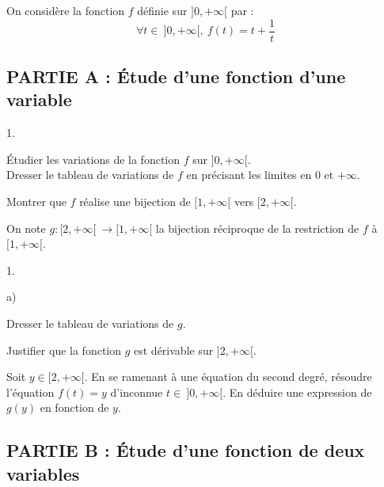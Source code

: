 \documentclass[11pt]{article}%
\begin{document}
\noindent %
On considère la fonction $f$ définie sur $]0,+\infty[$ par :
\[
  \forall t \in \ ]0,+\infty[, \ f(t) = t + \dfrac{1}{t}
\]

\subsection*{PARTIE A : \'Etude d'une fonction d'une variable} %

\begin{noliste}{1.}
  \setlength{\itemsep}{4mm}
\item \'Etudier les variations de la fonction $f$ sur $]0,+\infty[$.\\
  Dresser le tableau de variations de $f$ en précisant les limites en
  $0$ et $+\infty$.
  
\item Montrer que $f$ réalise une bijection de $[1,+\infty[$ vers $[2,+\infty[$.
\end{noliste}
On note $g : [2,+\infty[ \ \to [1,+\infty[$ la bijection réciproque de
la restriction de $f$ à $[1,+\infty[$.
\begin{noliste}{1.}
  \setlength{\itemsep}{4mm}
  \setcounter{enumi}{2}
\item
  \begin{noliste}{a)}
    \setlength{\itemsep}{2mm}
  \item Dresser le tableau de variations de $g$.
    
  \item Justifier que la fonction $g$ est dérivable sur $]2,+\infty[$.
    
  \item Soit $y \in [2,+\infty[$.
    En se ramenant à une équation du second degré, résoudre l'équation
    $f(t) = y$ d'inconnue $t \in \ ]0,+\infty[$. En déduire une
    expression de $g(y)$ en fonction de $y$.
  \end{noliste}
\end{noliste}


\subsection*{PARTIE B : \'Etude d'une fonction de deux variables} %
\end{document}
